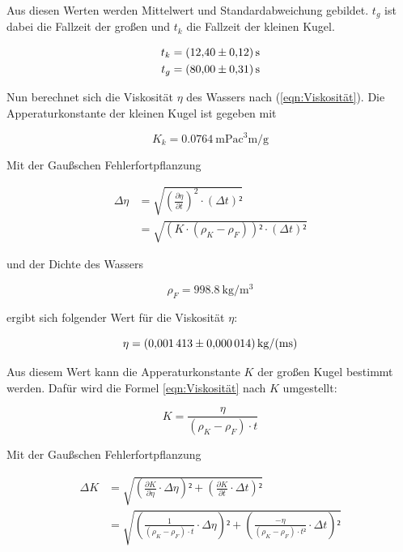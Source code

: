 Aus diesen Werten werden Mittelwert und Standardabweichung gebildet.
$t_g$ ist dabei die Fallzeit der großen und $t_k$ die Fallzeit der kleinen
Kugel.

\begin{align*}
t_k &= \SI{12.40+-0.12}{\second}\\
t_g &= \SI{80.00+-0.31}{\second}
\end{align*}

Nun berechnet sich die Viskosität $\eta$ des Wassers nach (\ref{eqn:Viskosität}).
Die Apperaturkonstante der kleinen Kugel ist gegeben mit 

\begin{equation*}
K_k = \SI{0.0764}{\milli\pascal\cubic\centi\meter\per\gram}
\end{equation*}

Mit der Gaußschen Fehlerfortpflanzung

\begin{align*}
\Delta \eta &= \sqrt{\left(\frac{\partial\eta}{\partial t}\right)^2 \cdot \left(\Delta t\right)²}\\
&=\sqrt{\left(K\cdot(\rho_K - \rho_F)\right)²\cdot(\Delta t)²}
\label{eqn:Fehlereta}
\end{align*}

und der Dichte des Wassers 

\begin{equation}
\rho _F = \SI{998.8}{\kilo\gram\per\cubic\meter}
\end{equation}

ergibt sich folgender Wert für die Viskosität $\eta$:

\begin{equation*}
\eta = \SI{0.001413+-0.000014}{\kilo\gram\per(\meter\second)}
\end{equation*}

Aus diesem Wert kann die Apperaturkonstante $K$ der großen Kugel
bestimmt werden. Dafür wird die Formel \ref{eqn:Viskosität} nach 
$K$ umgestellt: 

\begin{equation*}
K = \frac{\eta}{(\rho_K - \rho_F) \cdot t}
\end{equation*}

Mit der Gaußschen Fehlerfortpflanzung

\begin{align*}
\Delta K &= \sqrt{\left(\frac{\partial K}{\partial \eta}\cdot \Delta\eta\right)² + \left(\frac{\partial K}{\partial t}\cdot \Delta t\right)²}\\
&= \sqrt{\left(\frac{1}{(\rho_K - \rho_F)\cdot t}\cdot \Delta\eta\right)² + \left(\frac{-\eta}{(\rho_K - \rho_F)\cdot t²}\cdot \Delta t\right)²}
\end{align*}

